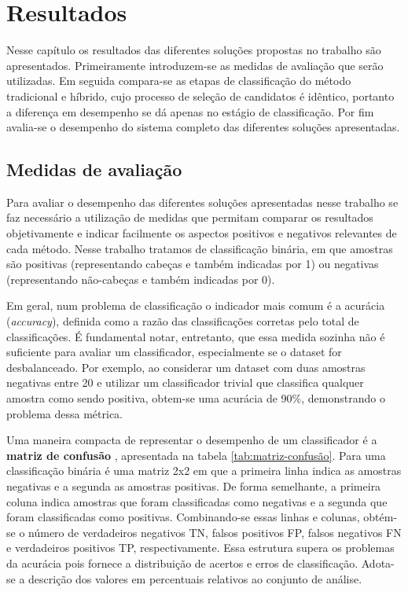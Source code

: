 \chapter{Resultados}
Nesse capítulo os resultados das diferentes soluções propostas no trabalho são apresentados. Primeiramente introduzem-se as medidas de avaliação que serão utilizadas. Em seguida compara-se as etapas de classificação do método tradicional e híbrido, cujo processo de seleção de candidatos é idêntico, portanto a diferença em desempenho se dá apenas no estágio de classificação. Por fim avalia-se o desempenho do sistema completo das diferentes soluções apresentadas.

\section{Medidas de avaliação}
Para avaliar o desempenho das diferentes soluções apresentadas nesse trabalho se faz necessário a utilização de medidas que permitam comparar os resultados objetivamente e indicar facilmente os aspectos positivos e negativos relevantes de cada método. Nesse trabalho tratamos de classificação binária, em que amostras são positivas (representando cabeças e também indicadas por 1) ou negativas (representando não-cabeças e também indicadas por 0). 

Em geral, num problema de classificação o indicador mais comum é a acurácia (\textit{accuracy}), definida \cite{evaluationMetrics} como a razão das classificações corretas pelo total de classificações. É fundamental notar, entretanto, que essa medida sozinha não é suficiente para avaliar um classificador, especialmente se o dataset for desbalanceado. Por exemplo, ao considerar um dataset com duas amostras negativas entre 20 e utilizar um classificador trivial que classifica qualquer amostra como sendo positiva, obtem-se uma acurácia de 90\%, demonstrando o problema dessa métrica.

Uma maneira compacta de representar o desempenho de um classificador é a \textbf{matriz de confusão} \cite{evaluationMetrics}, apresentada na tabela \ref{tab:matriz-confusão}. Para uma classificação binária é uma matriz 2x2 em que a primeira linha indica as amostras negativas e a segunda as amostras positivas. De forma semelhante, a primeira coluna indica amostras que foram classificadas como negativas e a segunda que foram classificadas como positivas. Combinando-se essas linhas e colunas, obtém-se o número de verdadeiros negativos TN, falsos positivos FP, falsos negativos FN e verdadeiros positivos TP, respectivamente. Essa estrutura supera os problemas da acurácia pois fornece a distribuição de acertos e erros de classificação. Adota-se a descrição dos valores em percentuais relativos ao conjunto de análise.

